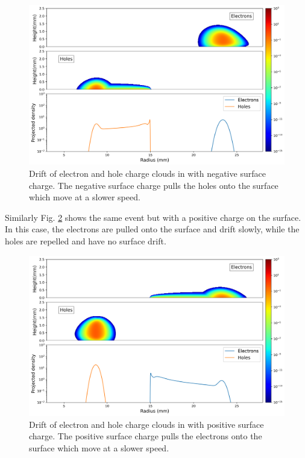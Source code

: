\begin{figure}%
    \includegraphics[trim={0cm 0 0cm 0},clip,width=0.99\linewidth]{ch3/figs/drift_path_sc=-0.3.png}
    \caption{Drift of electron and hole charge clouds in {\ehd} with negative surface charge. The negative surface charge pulls the holes onto the surface which move at a slower speed.}
    \label{ch3_fig_ehd_path_pd_sc_neg_0p3}
\end{figure}

Similarly Fig. \ref{ch3_fig_ehd_path_pd_sc_pos_0p3} shows the same event but with a positive charge on the surface. In this case, the electrons are pulled onto the surface and drift slowly, while the holes are repelled and have no surface drift. 

\begin{figure}%
    \includegraphics[trim={0cm 0 0cm 0},clip,width=0.99\linewidth]{ch3/figs/drift_path_sc=0.3.png}
    \caption{Drift of electron and hole charge clouds in {\ehd} with positive surface charge. The positive surface charge pulls the electrons onto the surface which move at a slower speed.}
    \label{ch3_fig_ehd_path_pd_sc_pos_0p3}
\end{figure}


